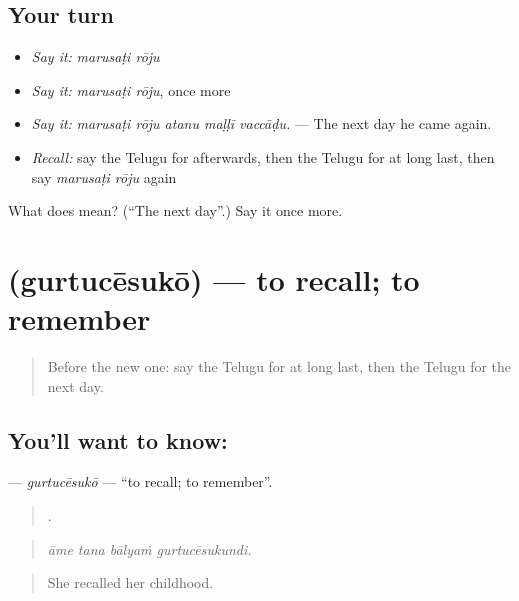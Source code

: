 \subsection*{Your turn}
\begin{itemize}
\raggedright
  \item \emph{Say it:} \emph{marusaṭi rōju}
  \item \emph{Say it:} \emph{marusaṭi rōju}, once more
  \item \emph{Say it:} \emph{marusaṭi rōju atanu maḷḷī vaccāḍu.} — The next day he came again.
  \item \emph{Recall:} say the Telugu for afterwards, then the Telugu for at long last, then say \emph{marusaṭi rōju} again
\end{itemize}

\begin{tcolorbox}[breakable,colback=teal!4,colframe=teal!35!black,title={Before you move on}]
What does   mean? (\textquotedblleft{}The next day\textquotedblright{}.) Say it once more.
\end{tcolorbox}
\section[\texorpdfstring{\te{గుర్తుచేసుకో} (gurtucēsukō)}{గుర్తుచేసుకో (gurtucēsukō)}]{ (gurtucēsukō) — to recall; to remember}

\label{lesson:TE-C328-gurtucesuko}



\begin{quote}
Before the new one: say the Telugu for at long last, then the Telugu for the next day.
\end{quote}

\subsection*{You'll want to know: }
\textbf{} — \emph{gurtucēsukō} — \textquotedblleft{}to recall; to remember\textquotedblright{}.

\begin{quote}
   .
\end{quote}

\begin{quote}
\emph{āme tana bālyaṁ gurtucēsukundi.}
\end{quote}

\begin{quote}
She recalled her childhood.
\end{quote}

